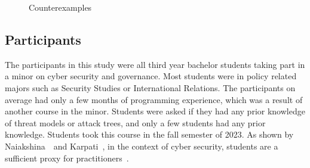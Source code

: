 \begin{figure}
\begin{subfigure}[b]{0.45\linewidth}
        \centering
        \resizebox{2cm}{!}{
            
        }
        \label{fig:b}
    \end{subfigure}
    \begin{subfigure}[b]{0.45\linewidth}
        \centering
        \resizebox{2cm}{!}{
            
        }
        \label{fig:b}
    \end{subfigure}
    \begin{subfigure}[b]{0.45\linewidth}
        \centering
        \resizebox{2cm}{!}{
            
        }
        \label{fig:b}
    \end{subfigure}
    \begin{subfigure}[b]{0.45\linewidth}
        \centering
        \resizebox{2cm}{!}{
            
        }
        \label{fig:b}
    \end{subfigure}
    \begin{subfigure}[b]{0.45\linewidth}
        \centering
        \resizebox{1.8cm}{!}{
            
        }
        \label{fig:b}
    \end{subfigure}
    \caption{Counterexamples}\label{fig:counterexamples}
\end{figure}







\subsection{Participants}
The participants in this study were all third year bachelor students taking part in a minor on cyber security and governance. Most students were in policy related majors such as Security Studies or International Relations. The participants on average had only a few months of programming experience, which was a result of another course in the minor. Students were asked if they had any prior knowledge of threat models or attack trees, and only a few students had any prior knowledge. Students took this course in the fall semester of 2023. As shown by Naiakshina~\etal\ and Karpati~\etal, in the context of cyber security, students are a sufficient proxy for practitioners~\cite{karpatiComparingAttackTrees2014, naiakshinaConductingSecurityDeveloper2020}.

